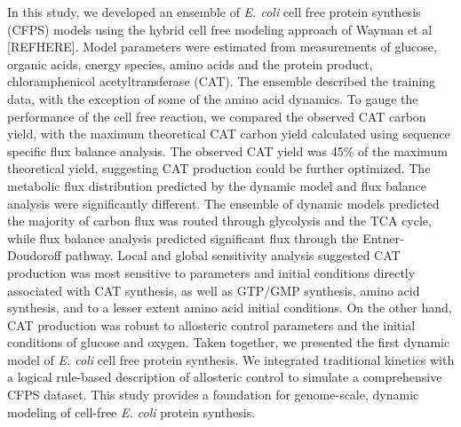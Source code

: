 \documentclass[12pt]{article}
\begin{document}
In this study, we developed an ensemble of \textit{E. coli} cell free protein synthesis (CFPS) models using the hybrid cell free modeling approach of Wayman et al [REFHERE].
Model parameters were estimated from measurements of glucose, organic acids, energy species, amino acids and the protein product, chloramphenicol acetyltransferase (CAT).
The ensemble described the training data, with the exception of some of the amino acid dynamics.
To gauge the performance of the cell free reaction, we compared the observed CAT carbon yield, with the maximum theoretical CAT carbon yield calculated using sequence specific flux
balance analysis. The observed CAT yield was 45\% of the maximum theoretical yield, suggesting CAT production could be further optimized.
The metabolic flux distribution predicted by the dynamic model and flux balance analysis were significantly different.
The ensemble of dynamic models predicted the majority of carbon flux was routed through glycolysis and the TCA cycle,
while flux balance analysis predicted significant flux through the Entner-Doudoroff pathway.
Local and global sensitivity analysis suggested CAT production was most sensitive to parameters and initial conditions directly associated with CAT synthesis, as well as
GTP/GMP synthesis, amino acid synthesis, and to a lesser extent amino acid initial conditions.
On the other hand, CAT production was robust to allosteric control parameters and the initial conditions of glucose and oxygen.
Taken together, we presented the first dynamic model of \textit{E. coli} cell free protein synthesis.
We integrated traditional kinetics with a logical rule-based description of allosteric control to simulate a comprehensive CFPS dataset.
This study provides a foundation for genome-scale, dynamic modeling of cell-free \textit{E. coli} protein synthesis.

\end{document}
